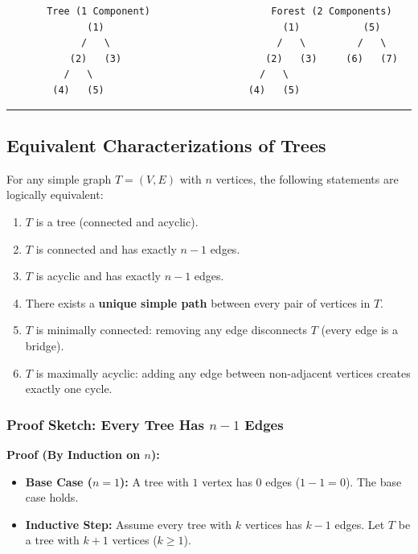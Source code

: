 \documentclass[
]{book}
\providecommand{\tightlist}{%
  \setlength{\itemsep}{0pt}\setlength{\parskip}{0pt}}
\theoremstyle{definition}
\theoremstyle{definition}
\theoremstyle{definition}
\theoremstyle{definition}
\theoremstyle{remark}
\begin{document}
\begin{verbatim}
       Tree (1 Component)                     Forest (2 Components)
              (1)                               (1)           (5)
             /   \                             /   \         /   \
           (2)   (3)                         (2)   (3)     (6)   (7)
          /   \                             /   \
        (4)   (5)                         (4)   (5)
\end{verbatim}

\begin{center}\rule{0.5\linewidth}{0.5pt}\end{center}

\subsection{Equivalent Characterizations of Trees}\label{equivalent-characterizations-of-trees}

For any simple graph \(T = (V, E)\) with \(n\) vertices, the following statements are logically equivalent:

\begin{enumerate}
\def\labelenumi{\arabic{enumi}.}
\tightlist
\item
  \(T\) is a tree (connected and acyclic).
\item
  \(T\) is connected and has exactly \(n - 1\) edges.
\item
  \(T\) is acyclic and has exactly \(n - 1\) edges.
\item
  There exists a \textbf{unique simple path} between every pair of vertices in \(T\).
\item
  \(T\) is minimally connected: removing any edge disconnects \(T\) (every edge is a bridge).
\item
  \(T\) is maximally acyclic: adding any edge between non-adjacent vertices creates exactly one cycle.
\end{enumerate}

\subsubsection{\texorpdfstring{Proof Sketch: Every Tree Has \(n - 1\) Edges}{Proof Sketch: Every Tree Has n - 1 Edges}}\label{proof-sketch-every-tree-has-n---1-edges}

\textbf{Proof (By Induction on \(n\)):}

\begin{itemize}
\tightlist
\item
  \textbf{Base Case (\(n=1\)):} A tree with \(1\) vertex has \(0\) edges (\(1 - 1 = 0\)). The base case holds.
\item
  \textbf{Inductive Step:} Assume every tree with \(k\) vertices has \(k - 1\) edges. Let \(T\) be a tree with \(k + 1\) vertices (\(k \ge 1\)).
\end{itemize}
\end{document}
